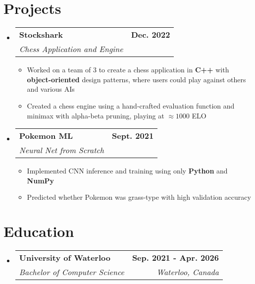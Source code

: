 \documentclass[letterpaper,11pt]{article}
\makeatletter
\newcommand{\resumeItem}[1]{
  \item\small{
    {#1 \vspace{-2pt}}
  }
}
\newcommand{\resumeSubheading}[4]{
  \vspace{-2pt}\item
    \begin{tabular*}{1.0\textwidth}[t]{l@{\extracolsep{\fill}}r}
      \textbf{#1} & \textbf{\small #2} \\
      \textit{\small#3} & \textit{\small #4} \\
    \end{tabular*}\vspace{-7pt}
}
\newcommand{\resumeSubHeadingListStart}{\begin{itemize}[leftmargin=0.0in, label={}]}
\newcommand{\resumeSubHeadingListEnd}{\end{itemize}}
\newcommand{\resumeItemListStart}{\begin{itemize}}
\newcommand{\resumeItemListEnd}{\end{itemize}\vspace{-5pt}}
\makeatother
\begin{document}
\section{Projects}
  \resumeSubHeadingListStart



      \resumeSubheading
      {Stockshark}{Dec. 2022}
      {Chess Application and Engine}{}
      \resumeItemListStart
        \resumeItem{Worked on a team of 3 to create a chess application in \textbf{C++} with \textbf{object-oriented} design patterns, where users could play against others and various AIs}
        \resumeItem{Created a chess engine using a hand-crafted evaluation function and minimax with alpha-beta pruning, playing at $\approx 1000$ ELO}
        \resumeItemListEnd

    \resumeSubheading
      {Pokemon ML}{Sept. 2021}
      {Neural Net from Scratch}{}
      \resumeItemListStart
        \resumeItem{Implemented CNN inference and training using only \textbf{Python} and \textbf{NumPy}}
        \resumeItem{Predicted whether Pokemon was grass-type with high validation accuracy}
        \resumeItemListEnd
    
  \resumeSubHeadingListEnd
\vspace{-16pt}
\section{Education}
\resumeSubHeadingListStart
\resumeSubheading
{University of Waterloo}{Sep. 2021 - Apr. 2026}{Bachelor of Computer Science}{Waterloo, Canada}
\resumeSubHeadingListEnd
\end{document}
